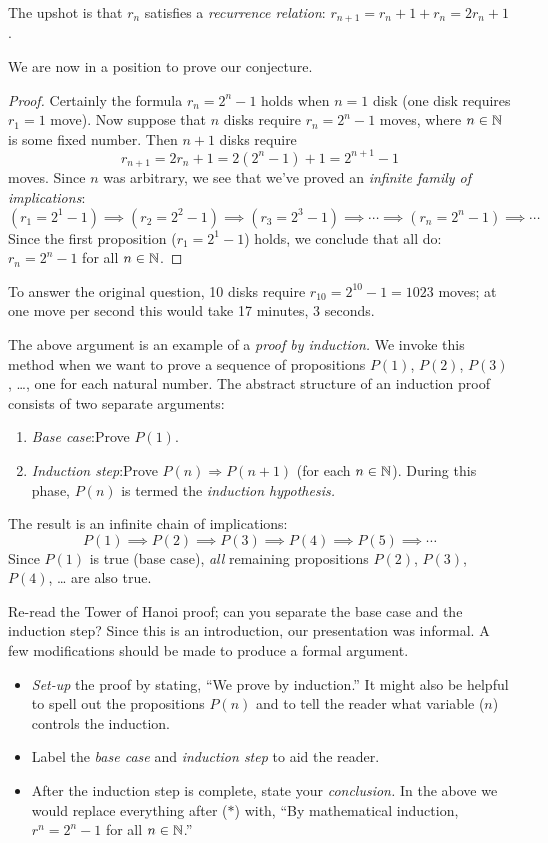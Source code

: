 The upshot is that $r_n$ satisfies a \emph{recurrence relation}: $r_{n+1}=r_n+1+r_n=2r_n+1$.

\goodbreak

We are now in a position to prove our conjecture.

\begin{proof}
	Certainly the formula $r_n=2^n-1$ holds when $n=1$ disk (one disk requires $r_1=1$ move).\smallbreak
	Now suppose that $n$ disks require $r_n=2^n-1$ moves, where $n\in\mathbb{N}$ is some fixed number. Then $n+1$ disks require
	\[
		r_{n+1}=2r_n+1=2(2^n-1)+1 =2^{n+1}-1 \tag{$\ast$}
	\]
	moves. Since $n$ was arbitrary, we see that we've proved an \emph{infinite family of implications}: 
	\[
		(r_1=2^1-1)\implies (r_2=2^2-1)\implies (r_3=2^3-1) \implies \cdots \implies (r_n=2^n-1)\implies \cdots
	\]
	Since the first proposition ($r_1=2^1-1$) holds, we conclude that all do: $r_n=2^n-1$ for all $n\in\mathbb{N}$.
\end{proof}

To answer the original question, 10 disks require $r_{10}=2^{10}-1=1023$ moves; at one move per second this would take 17 minutes, 3 seconds.




The above argument is an example of a \emph{proof by induction.} We invoke this method when we want to prove a sequence of propositions $P(1)$, $P(2)$, $P(3)$, \ldots, one for each natural number. The abstract structure of an induction proof consists of two separate arguments:
\begin{enumerate}
  \item \emph{Base case}:\lstsp Prove $P(1)$.
  \item \emph{Induction step}:\lstsp Prove $P(n)\Longrightarrow P(n+1)$ (for each $n\in\mathbb{N}$). During this phase, $P(n)$ is termed the \emph{induction hypothesis.}
\end{enumerate}
The result is an infinite chain of implications:
\[
	P(1)\implies P(2)\implies P(3)\implies P(4)\implies P(5)\implies \cdots
\]
Since $P(1)$ is true (base case), \emph{all} remaining propositions $P(2)$, $P(3)$, $P(4)$, \ldots{} are also true.\smallbreak

Re-read the Tower of Hanoi proof; can you separate the base case and the induction step? Since this is an introduction, our presentation was informal. A few modifications should be made to produce a formal argument.

\begin{itemize}
  \item \emph{Set-up} the proof by stating, ``We prove by induction.'' It might also be helpful to spell out the propositions $P(n)$ and to tell the reader what variable ($n$) controls the induction.
  \item Label the \emph{base case} and \emph{induction step} to aid the reader.
  \item After the induction step is complete, state your \emph{conclusion.} In the above we would replace everything after ($\ast$) with, ``By mathematical induction, $r^n=2^n-1$ for all $n\in\mathbb{N}$.''
\end{itemize}

